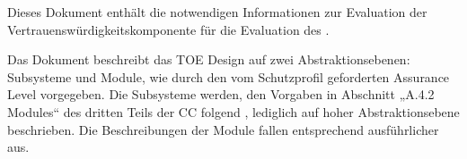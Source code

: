 
Dieses Dokument enthält die notwendigen Informationen zur Evaluation der
Vertrauenswürdigkeitskomponente  für die Evaluation des
\thisproductlong{}.

Das Dokument beschreibt das TOE Design auf zwei Abstraktionsebenen: Subsysteme
und Module, wie durch den vom Schutzprofil geforderten Assurance Level
 vorgegeben. Die Subsysteme werden, den Vorgaben in Abschnitt
„A.4.2 Modules“ des dritten Teils der CC folgend \cite{CCPart3}, lediglich auf
hoher Abstraktionsebene beschrieben. Die Beschreibungen der Module fallen
entsprechend ausführlicher aus.




